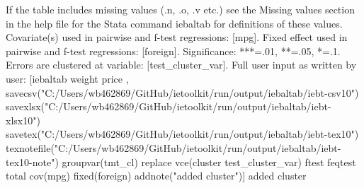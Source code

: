 If the table includes missing values (.n, .o, .v etc.) see the Missing values section in the help file for the Stata command iebaltab for definitions of these values. Covariate(s) used in pairwise and f-test regressions: [mpg]. Fixed effect used in pairwise and f-test regressions: [foreign]. Significance: ***=.01, **=.05, *=.1. Errors are clustered at variable: [test\_cluster\_var]. Full user input as written by user: [iebaltab weight price , savecsv("C:/Users/wb462869/GitHub/ietoolkit/run/output/iebaltab/iebt-csv10") savexlsx("C:/Users/wb462869/GitHub/ietoolkit/run/output/iebaltab/iebt-xlsx10") savetex("C:/Users/wb462869/GitHub/ietoolkit/run/output/iebaltab/iebt-tex10") texnotefile("C:/Users/wb462869/GitHub/ietoolkit/run/output/iebaltab/iebt-tex10-note") groupvar(tmt\_cl) replace vce(cluster test\_cluster\_var) ftest feqtest total cov(mpg) fixed(foreign) addnote("added cluster")] added cluster
